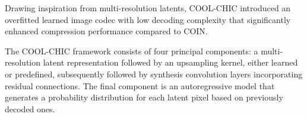 Drawing inspiration from multi-resolution latents, COOL-CHIC introduced an overfitted learned image codec with low decoding complexity that significantly enhanced compression performance compared to COIN.

The COOL-CHIC framework \cite{laduneCOOLCHICCoordinatebasedLow2023, leeEntropyConstrainedImplicitNeural2023, leguayLowComplexityOverfittedNeural2023, blardOverfittedImageCoding2024} consists of four principal components: a multi-resolution latent representation followed by an upsampling kernel, either learned or predefined, subsequently followed by synthesis convolution layers incorporating residual connections. The final component is an autoregressive model that generates a probability distribution for each latent pixel based on previously decoded ones.